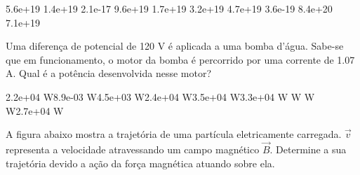 \documentclass[12pt, addpoints]{exam}
\begin{document}
\begin{questions}
\begin{multicols*}{2}
\begin{oneparchoices}
\choice 5.6e+19 \choice 1.4e+19 \choice 2.1e-17 \choice 9.6e+19 \choice 1.7e+19 \choice 3.2e+19 \choice 4.7e+19 \choice 3.6e-19 \choice 8.4e+20 \choice 7.1e+19 
\end{oneparchoices}\question Uma diferença de potencial de 120 V é aplicada a uma bomba d’água. Sabe-se que em funcionamento, o motor da bomba é percorrido por uma corrente de    1.07 A. Qual é a potência desenvolvida nesse motor?

\begin{oneparchoices}
\choice 2.2e+04 W\choice 8.9e-03 W\choice 4.5e+03 W\choice 2.4e+04 W\choice 3.5e+04 W\choice 3.3e+04 W W W W\choice 2.7e+04 W
\end{oneparchoices}\question A ﬁgura abaixo mostra a trajetória de uma partícula eletricamente carregada. $\vec{{v}}$ representa a velocidade atravessando um campo magnético $\vec{{B}}$. Determine a sua trajetória devido a ação da força magnética atuando sobre ela.
        
        \begin{center}
            \begin{minipage}[c]{0.5\linewidth}
            \end{minipage}
        \end{center}

        


\end{multicols*}
\end{questions}
\end{document}
